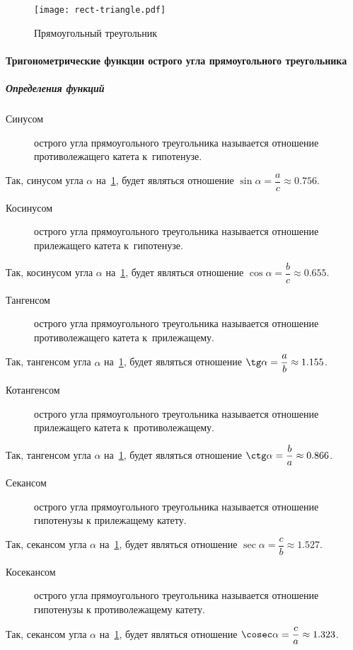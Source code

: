 \documentclass[]{scrartcl}
\begin{document}
\begin{figure}[ht]
	\centering %
	\texttt{[image: rect-triangle.pdf]}
	\caption{Прямоугольный треугольник}\label{fig:rect-triangle-1}
\end{figure}

\paragraph{Тригонометрические функции острого угла прямоугольного треугольника}
\subparagraph{Определения функций}
\begin{description}
	\item[Синусом] острого угла прямоугольного треугольника называется отношение противолежащего катета к~гипотенузе.
\end{description}
Так, синусом угла ${\textstyle \alpha}$ на~\ref{fig:rect-triangle-1}, будет являться отношение ${\textstyle \sin \alpha = \dfrac{a}{c} \approx 0.756}$.
\begin{description}
	\item[Косинусом] острого угла прямоугольного треугольника называется отношение прилежащего катета к~гипотенузе.
\end{description}
Так, косинусом угла ${\textstyle \alpha}$ на~\ref{fig:rect-triangle-1}, будет являться отношение ${\textstyle \cos \alpha = \dfrac{b}{c} \approx 0.655}$.
\begin{description}
	\item[Тангенсом] острого угла прямоугольного треугольника называется отношение противолежащего катета к~прилежащему.
\end{description}
Так, тангенсом угла ${\textstyle \alpha}$ на~\ref{fig:rect-triangle-1}, будет являться отношение ${\textstyle \tg \alpha = \dfrac{a}{b} \approx 1.155}$.
\begin{description}
	\item[Котангенсом] острого угла прямоугольного треугольника называется отношение прилежащего катета к~противолежащему.
\end{description}
Так, тангенсом угла ${\textstyle \alpha}$ на~\ref{fig:rect-triangle-1}, будет являться отношение ${\textstyle \ctg \alpha = \dfrac{b}{a} \approx 0.866}$.
\begin{description}
	\item[Секансом] острого угла прямоугольного треугольника называется отношение гипотенузы к прилежащему катету.
\end{description}
Так, секансом угла ${\textstyle \alpha}$ на~\ref{fig:rect-triangle-1}, будет являться отношение ${\textstyle \sec \alpha = \dfrac{c}{b} \approx 1.527}$.
\begin{description}
	\item[Косекансом] острого угла прямоугольного треугольника называется отношение гипотенузы к противолежащему катету.
\end{description}
Так, секансом угла ${\textstyle \alpha}$ на~\ref{fig:rect-triangle-1}, будет являться отношение ${\textstyle \cosec \alpha = \dfrac{c}{a} \approx 1.323}$.
\end{document}
